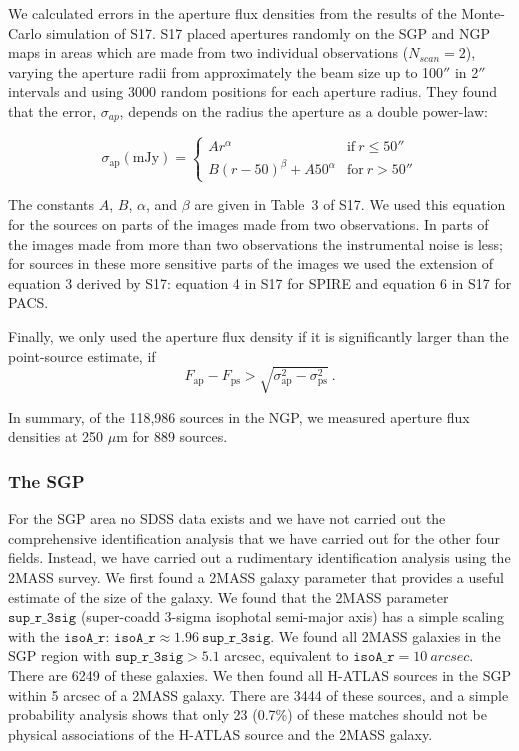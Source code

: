 \documentclass[useAMS,usenatbib]{mn2e}
\begin{document}
We calculated errors in the aperture flux densities from the
results of the Monte-Carlo simulation of S17. S17
placed apertures randomly on the SGP and NGP
maps in areas which are made from two individual observations
($N_{scan}=2$), varying the aperture radii from approximately
the beam size up to 100$''$ in 2$''$ intervals and using 3000
random positions for each aperture radius.
They found that the error, $\sigma_{ap}$, depends on the radius
the aperture as a double power-law:

\begin{equation}
  \sigma_{\mathrm{ap}}(\mathrm{mJy}) =
  \begin{cases}
      Ar^\alpha &   \mathrm{if\ } r\le 50'' \\
      B(r-50)^\beta + A 50^\alpha & \mathrm{for\ } r>50''
    \end{cases}
\end{equation}

The constants $A$, $B$, $\alpha$, and $\beta$  are given in Table~3 of S17.
We used this equation for the sources on parts of the images made from two
observations. In parts of the images made from more than two observations
the instrumental noise is less; for sources in these more sensitive parts of
the images we used the extension of equation 3 derived by S17: equation
4 in S17 for SPIRE and equation 6 in S17 for PACS.

Finally, we only used the aperture flux density if
it is significantly larger than the point-source estimate, if
\begin{equation}
F_\mathrm{ap}- F_\mathrm{ps}>\sqrt{\sigma_\mathrm{ap}^2-\sigma_\mathrm{ps}^2}
\ .
\end{equation}

In summary, of the 118,986 sources in the NGP, we measured aperture
flux densities at 250 $\mu$m for 889 sources. 

\subsubsection{The SGP}

For the SGP area no SDSS data exists
and we have not carried out the comprehensive identification analysis
that we have carried out for the other four fields. Instead, we have
carried out a rudimentary identification analysis using the
2MASS survey. We first found a 2MASS galaxy parameter that provides
a useful estimate of the size of the galaxy. We found that
the 2MASS parameter $\mathtt{sup\_r\_3sig}$
(super-coadd 3-sigma isophotal semi-major
axis) has a simple scaling with the
$\mathtt {isoA\_r}$:
$\mathtt{isoA\_r} \approx 1.96 \ \mathtt{sup\_r\_3sig}$.
We found all 2MASS galaxies in the SGP region with $\mathtt{sup\_r\_3sig}>5.1$ arcsec,
equivalent to $\mathtt{isoA\_r}=10\ arcsec$. There are 6249 of these
galaxies. We then found all H-ATLAS sources in the SGP within 5 arcsec
of a 2MASS galaxy. There are 3444 of these sources, and a simple
probability analysis shows that only 23 (0.7\%) of these matches
should not be physical associations of the
H-ATLAS source and the 2MASS galaxy.
\end{document}
